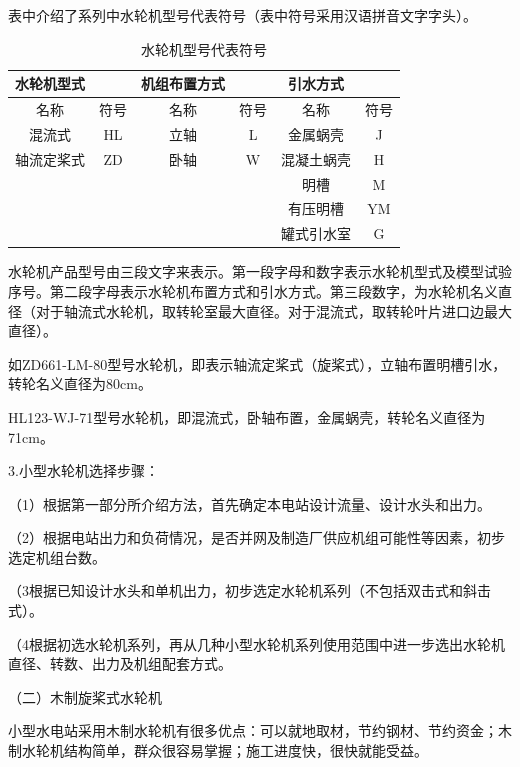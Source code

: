 \documentclass{ctexbook}
\begin{document}
表中介绍了系列中水轮机型号代表符号（表中符号采用汉语拼音文字字头）。
\begin{table}[htbp]
	\centering
	\caption{水轮机型号代表符号}
	\begin{tabular}{cccc|c|c|}
		\toprule
		\multicolumn{1}{|c|}{水轮机型式} & \multicolumn{1}{c|}{} & \multicolumn{1}{c|}{机组布置方式} &       & 引水方式  &  \\
		\midrule
		\multicolumn{1}{|c|}{名称} & \multicolumn{1}{c|}{符号} & \multicolumn{1}{c|}{名称} & 符号    & 名称    & 符号 \\
		\midrule
		\multicolumn{1}{|c|}{混流式} & \multicolumn{1}{c|}{HL} & \multicolumn{1}{c|}{立轴} & L     & 金属蜗壳  & J \\
		\midrule
		\multicolumn{1}{|c|}{轴流定桨式} & \multicolumn{1}{c|}{ZD} & \multicolumn{1}{c|}{卧轴} & W     & 混凝土蜗壳 & H \\
		\midrule
		&       &       &       & 明槽    & M \\
		\cmidrule{5-6}          &       &       &       & 有压明槽  & YM \\
		\cmidrule{5-6}          &       &       &       & 罐式引水室 & G \\
		\cmidrule{5-6}    \end{tabular}%
	\label{tab:shuilunjixinghao}%
\end{table}%
水轮机产品型号由三段文字来表示。第一段字母和数字表示水轮机型式及模型试验序号。第二段字母表示水轮机布置方式和引水方式。第三段数字，为水轮机名义直径（对于轴流式水轮机，取转轮室最大直径。对于混流式，取转轮叶片进口边最大直径）。

如ZD661-LM-80型号水轮机，即表示轴流定桨式（旋桨式），立轴布置明槽引水，转轮名义直径为80cm。

HL123-WJ-71型号水轮机，即混流式，卧轴布置，金属蜗壳，转轮名义直径为71cm。

3.小型水轮机选择步骤：

（1）根据第一部分所介绍方法，首先确定本电站设计流量、设计水头和出力。

（2）根据电站出力和负荷情况，是否并网及制造厂供应机组可能性等因素，初步选定机组台数。

（3根据已知设计水头和单机出力，初步选定水轮机系列（不包括双击式和斜击式）。

（4根据初选水轮机系列，再从几种小型水轮机系列使用范围中进一步选出水轮机直径、转数、出力及机组配套方式。

（二）木制旋桨式水轮机

小型水电站采用木制水轮机有很多优点：可以就地取材，节约钢材、节约资金；木制水轮机结构简单，群众很容易掌握；施工进度快，很快就能受益。
\end{document}
